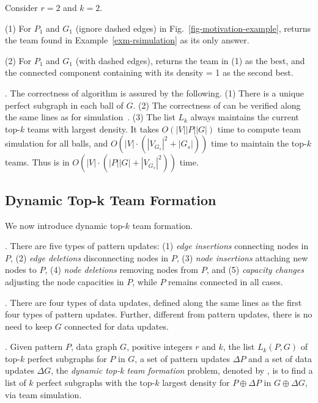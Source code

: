 {\begin{example}
\label{exa-alg-batch} Consider $r=2$ and $k=2$.

\sstab(1) For $P_1$ and $G_1$ (ignore dashed edges) in Fig.~\ref{fig-motivation-example},
 \grouprec returns the team found in Example~\ref{exm-rsimulation} as its only answer.

\sstab(2) For $P_1$ and $G_1$ (with dashed edges), \grouprec returns the team in (1) as the best,
and the connected component containing  with its density = 1 as the second best.
\end{example}


. The correctness of algorithm \grouprec is assured by the following.
(1) There is a unique perfect subgraph in each ball of $G$.
(2) The correctness of \rgraphsim can be verified along the same lines as for simulation~\cite{infsimu95}.
(3) The list $L_{k}$ always maintains the current top-$k$ teams with largest density.
It takes $O(|V||P||G|)$ time to compute team simulation for all balls,
and $O(|V|\cdot(|V_{G_s}|^2+|G_s|))$ time to maintain the top-$k$ teams.
Thus \grouprec is in $O(|V|\cdot(|P||G|+|V_{G_s}|^2))$ time.
}%


\subsection{Dynamic Top-k Team Formation}
\label{subsec-dynteamF}

We now introduce dynamic top-$k$ team formation.

. There are five types of pattern updates:
%
(1) {\em edge insertions} connecting nodes in $P$,
%
(2) {\em edge deletions} disconnecting nodes in $P$,
%
(3) {\em node insertions} attaching new nodes to $P$,
%
(4) {\em node deletions} removing nodes from $P$, and
%
(5) {\em capacity changes} adjusting the node capacities in $P$,
%
while $P$  remains connected in all cases.


. There are four types of data updates,
defined along the same lines as the first four types of pattern updates.
Further, different from pattern updates, there is no need to keep $G$ connected for data updates.


. Given pattern $P$, data graph $G$, positive integers $r$ and $k$, the list $L_{k}(P,G)$ of top-$k$ perfect subgraphs for $P$ in $G$,
a set of pattern updates $\Delta P$ and a set of data updates $\Delta G$,
the {\em dynamic top-k team formation} problem, denoted by ,
is to find a list of $k$ perfect subgraphs with the top-$k$ largest density for $P\oplus\Delta P$ in $G\oplus\Delta G$, via team simulation.


